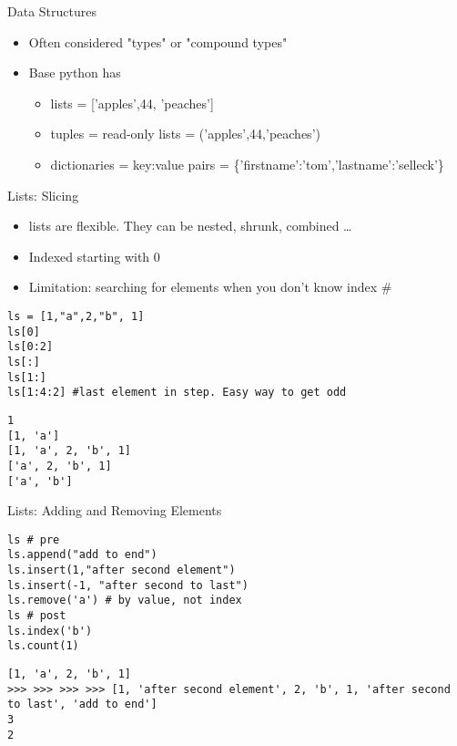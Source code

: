 \documentclass[presentation]{beamer}
\begin{document}
\begin{frame}[label=sec-4-1-6]{Data Structures}
\begin{itemize}
\item Often considered "types" or "compound types"
\item Base python has
\begin{itemize}
\item lists = ['apples',44, 'peaches']
\item tuples = read-only lists = ('apples',44,'peaches')
\item dictionaries = key:value pairs = \{'firstname':'tom','lastname':'selleck'\}
\end{itemize}
\end{itemize}
\end{frame}


\begin{frame}[fragile,label=sec-4-1-7]{Lists: Slicing}
 \begin{itemize}
\item lists are flexible. They can be nested, shrunk, combined \ldots{}
\item Indexed starting with 0
\item Limitation: searching for elements when you don't know index \#
\end{itemize}

\lstset{numbers=left,language=Python,label= ,caption= }
\begin{lstlisting}
ls = [1,"a",2,"b", 1]
ls[0]
ls[0:2]
ls[:]
ls[1:]
ls[1:4:2] #last element in step. Easy way to get odd
\end{lstlisting}

\lstset{numbers=left,language=Python,label= ,caption= }
\begin{lstlisting}
1
[1, 'a']
[1, 'a', 2, 'b', 1]
['a', 2, 'b', 1]
['a', 'b']
\end{lstlisting}
\end{frame}


\begin{frame}[fragile,label=sec-4-1-8]{Lists: Adding and Removing Elements}
 \lstset{numbers=left,language=Python,label= ,caption= }
\begin{lstlisting}
ls # pre
ls.append("add to end")
ls.insert(1,"after second element")
ls.insert(-1, "after second to last")
ls.remove('a') # by value, not index
ls # post
ls.index('b')
ls.count(1)
\end{lstlisting}

\lstset{numbers=left,language=Python,label= ,caption= }
\begin{lstlisting}
[1, 'a', 2, 'b', 1]
>>> >>> >>> >>> [1, 'after second element', 2, 'b', 1, 'after second to last', 'add to end']
3
2
\end{lstlisting}
\end{frame}
\end{document}
